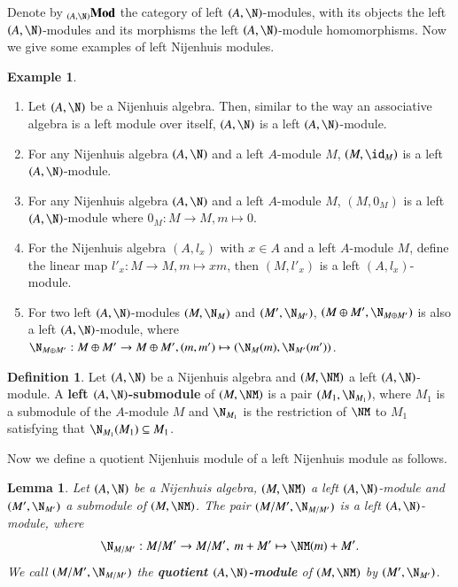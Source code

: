 \documentclass[12pt]{amsart}
\newtheorem{lemma}[theorem]{Lemma}
\theoremstyle{definition}
\newtheorem{defn}[theorem]{Definition}
\newtheorem{exam}[theorem]{Example}
\begin{document}
Denote by $ _{(A,\N)}{\bf Mod}$ the category of left $(A,\N)$-modules, with its objects the left $(A,\N)$-modules and its morphisms the left $(A,\N)$-module homomorphisms. Now we give some examples of left Nijenhuis modules.

\begin{exam}

\begin{enumerate}
\item Let $(A,\N)$ be a Nijenhuis algebra. Then, similar to the way an associative algebra is a left module over itself,  $(A,\N)$ is a left $(A,\N)$-module.

\item For any Nijenhuis algebra $(A, \N)$ and a left $A$-module $M$, $(M,\id_M)$ is a left $(A,\N)$-module.

\item For any Nijenhuis algebra $(A,\N)$ and a left $A$-module $M$, $(M,0_M)$ is a left $(A,\N)$-module where $0_M: M \to M, m \mapsto 0$.

\item For the Nijenhuis algebra $(A, l_x)$ with $x \in A$ and a left $A$-module $M$, define the linear map $l'_x: M \to M, m \mapsto x m$, then $(M,l'_x)$ is a left $(A, l_x)$-module.

\item For two left $(A,\N)$-modules $(M,\N_M)$ and $(M',\N_{M'})$, $(M \oplus M', \N_{M \oplus M'})$ is also a left $(A,\N)$-module, where $\N_{M \oplus M'}: M \oplus M' \to M \oplus M', (m,m') \mapsto (\N_{M}(m), \N_{M'}(m'))$.
\end{enumerate}
\end{exam}

\begin{defn}
Let $(A,\N)$ be a Nijenhuis algebra and $(M,\NM)$ a left $(A,\N)$-module. A {\bf left $(A,\N)$-submodule} of $(M,\NM )$ is a pair $(M_1, \N_{M_1})$, where $M_1$ is a submodule of the $A$-module $M$ and $\N_{M_1}$ is the restriction of $\NM$ to $M_1$ satisfying that $\N_{M_1}(M_1) \subseteq M_1$. 
\end{defn}

Now we define a quotient Nijenhuis module of a left Nijenhuis module as follows.
\begin{lemma}
Let $(A,\N )$ be a Nijenhuis algebra, $(M,\NM)$ a left $(A,\N)$-module and $(M',\N_{M'})$ a submodule of $(M,\NM)$. The pair
$(M/M',\N_{M/M'})$ is a left $(A,\N)$-module, where
%
$$\N_{M/M'}: M/M' \to M/M', \ m+M' \mapsto \NM(m)+M'.$$
%
We call $(M/M', \N_{M/M'})$ the {\bf quotient $(A,\N)$-module} of $(M,\NM )$ by $(M', \N_{M'})$.
\end{lemma}
\end{document}
